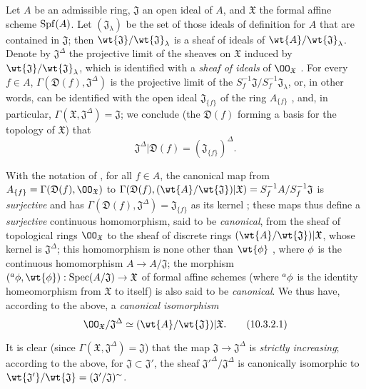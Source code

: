 \begin{env}[10.3.1]
\label{1.10.3.1}
Let $A$ be an admissible ring, $\mathfrak{J}$ an open ideal of $A$, and $\mathfrak{X}$ the formal affine scheme $\operatorname{Spf}(A)$.
Let $(\mathfrak{J}_\lambda)$ be the set of those ideals of definition for $A$ that are contained in $\mathfrak{J}$; then $\wt{\mathfrak{J}}/\wt{\mathfrak{J}}_\lambda$ is a sheaf of ideals of $\wt{A}/\wt{\mathfrak{J}}_\lambda$.
Denote by $\mathfrak{J}^\Delta$ the projective limit of the sheaves on $\mathfrak{X}$ induced by $\wt{\mathfrak{J}}/\wt{\mathfrak{J}}_\lambda$, which is identified with a \emph{sheaf of ideals} of $\OO_\mathfrak{X}$ .
For every $f\in A$, $\Gamma(\mathfrak{D}(f),\mathfrak{J}^\Delta)$ is the projective limit of the $S_f^{-1}\mathfrak{J}/S_f^{-1}\mathfrak{J}_\lambda$, or, in other words, can be identified with the open ideal $\mathfrak{J}_{\{f\}}$ of the ring $A_{\{f\}}$ , and, in particular, $\Gamma(\mathfrak{X},\mathfrak{J}^\Delta)=\mathfrak{J}$; we conclude (the $\mathfrak{D}(f)$ forming a basis for the topology of $\mathfrak{X}$) that
\begin{equation*}
\label{1.10.3.1.1}
  \mathfrak{J}^\Delta|\mathfrak{D}(f)=(\mathfrak{J}_{\{f\}})^\Delta.
  \tag{10.3.1.1}
\end{equation*}
\end{env}

\begin{env}[10.3.2]
\label{1.10.3.2}
With the notation of , for all $f\in A$, the canonical map from $A_{\{f\}}=\Gamma(\mathfrak{D}(f),\OO_\mathfrak{X})$ to $\Gamma(\mathfrak{D}(f),(\wt{A}/\wt{\mathfrak{J}})|\mathfrak{X})=S_f^{-1}A/S_f^{-1}\mathfrak{J}$ is \emph{surjective} and has $\Gamma(\mathfrak{D}(f),\mathfrak{J}^\Delta)=\mathfrak{J}_{\{f\}}$ as its kernel ; these maps thus define a \emph{surjective} continuous homomorphism, said to be \emph{canonical}, from the sheaf of topological rings $\OO_\mathfrak{X}$ to the sheaf of discrete rings $(\wt{A}/\wt{\mathfrak{J}})|\mathfrak{X}$, whose kernel is $\mathfrak{J}^\Delta$; this homomorphism is none other than $\wt{\vphi}$ , where $\phi$ is the continuous homomorphism $A\to A/\mathfrak{J}$; the morphism $({}^a\vphi,\wt{\vphi}):\Spec(A/\mathfrak{J})\to\mathfrak{X}$ of formal affine schemes (where ${}^a\phi$ is the identity homeomorphism from $\mathfrak{X}$ to itself) is also said to be \emph{canonical}.
We thus have, according to the above, a \emph{canonical isomorphism}
\begin{equation*}
\label{1.10.3.2.1}
  \OO_\mathfrak{X}/\mathfrak{J}^\Delta\isoto(\wt{A}/\wt{\mathfrak{J}})|\mathfrak{X}.
  \tag{10.3.2.1}
\end{equation*}

It is clear (since $\Gamma(\mathfrak{X},\mathfrak{J}^\Delta)=\mathfrak{J}$) that the map $\mathfrak{J}\to\mathfrak{J}^\Delta$ is \emph{strictly increasing}; according to the above, for $\mathfrak{J}\subset\mathfrak{J}'$, the sheaf ${\mathfrak{J}'}^\Delta/\mathfrak{J}^\Delta$ is canonically isomorphic to $\wt{\mathfrak{J}'}/\wt{\mathfrak{J}}=(\mathfrak{J}'/\mathfrak{J})^\sim$.
\end{env}

